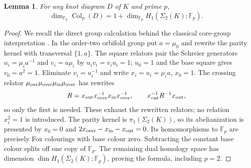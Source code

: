 \documentclass[11pt]{article}
\newtheorem{lemma}[theorem]{Lemma}
\newcommand{\F}{\mathbb F}
\newcommand{\Sig}{\Sigma_2}
\begin{document}
\begin{lemma}\label{lem:fox}
For any knot diagram $D$ of $K$ and prime $p$,
\[
 \dim_{\F_p}\operatorname{Col}_p(D)
       =1+\dim_{\F_p}H_1(\Sig(K);\F_p).
\]
\end{lemma}
\begin{proof}
We recall the direct group calculation behind the classical core-group
interpretation \cite{core}. In the order-two orbifold group put
$a=\mu_0$ and rewrite the parity kernel with transversal $\{1,a\}$.
The square relators pair the Schreier generators
$u_i=\mu_i a^{-1}$ and $v_i=a\mu_i$ by $u_iv_i=v_iu_i=1$;
$u_0=1$ and the base square gives $v_0=a^2=1$.
Eliminate $v_i=u_i^{-1}$ and write $x_i=u_i=\mu_i a$, $x_0=1$.
The crossing relator
$\mu_{\rm out}\mu_{\rm over}\mu_{\rm in}\mu_{\rm over}$ has rewrites
\[
 R=x_{\rm out}x_{\rm over}^{-1}x_{\rm in}x_{\rm over}^{-1},
 \qquad x_{\rm out}^{-1}R^{-1}x_{\rm out},
\]
so only the first is needed. These exhaust the rewritten relators;
no relation $x_i^2=1$ is introduced. The parity kernel is
$\pi_1(\Sig(K))$, so its abelianization is presented by $x_0=0$
and $2x_{\rm over}-x_{\rm in}-x_{\rm out}=0$.
Its homomorphisms to $\F_p$ are precisely Fox colourings with base
colour zero. Subtracting the constant base colour splits off one
copy of $\F_p$. The remaining dual homology space has dimension
$\dim H_1(\Sig(K);\F_p)$, proving the formula, including $p=2$.
\end{proof}
\end{document}
